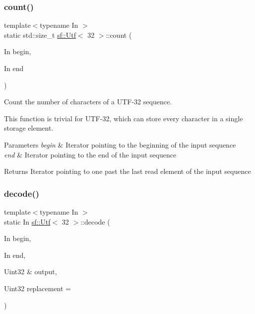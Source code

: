 \subsubsection{\texorpdfstring{count()}{count()}}
{\footnotesize\ttfamily template$<$typename In $>$ \\
static std\+::size\+\_\+t \hyperlink{classsf_1_1_utf}{sf\+::\+Utf}$<$ 32 $>$\+::count (\begin{DoxyParamCaption}\item[{In}]{begin,  }\item[{In}]{end }\end{DoxyParamCaption})\hspace{0.3cm}{\ttfamily [static]}}



Count the number of characters of a U\+T\+F-\/32 sequence. 

This function is trivial for U\+T\+F-\/32, which can store every character in a single storage element.


\begin{DoxyParams}{Parameters}
{\em begin} & Iterator pointing to the beginning of the input sequence \\
\hline
{\em end} & Iterator pointing to the end of the input sequence\\
\hline
\end{DoxyParams}
\begin{DoxyReturn}{Returns}
Iterator pointing to one past the last read element of the input sequence 
\end{DoxyReturn}
\mbox{\label{classsf_1_1_utf_3_0132_01_4_ad754ce8476f7b80563890dec12cefd46}} 
\subsubsection{\texorpdfstring{decode()}{decode()}}
{\footnotesize\ttfamily template$<$typename In $>$ \\
static In \hyperlink{classsf_1_1_utf}{sf\+::\+Utf}$<$ 32 $>$\+::decode (\begin{DoxyParamCaption}\item[{In}]{begin,  }\item[{In}]{end,  }\item[{Uint32 \&}]{output,  }\item[{Uint32}]{replacement = {} }\end{DoxyParamCaption})\hspace{0.3cm}{\ttfamily [static]}}



